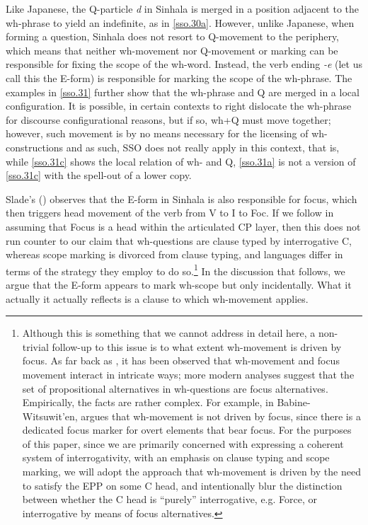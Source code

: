 \documentclass[charis]{glossa}
\begin{document}
Like Japanese, the Q-particle \textit{d\textschwa} in Sinhala is merged in a position adjacent to the wh-phrase to yield an indefinite, as in \ref{sso.30a}. However, unlike Japanese, when forming a question, Sinhala does not resort to Q-movement to the periphery, which means that neither wh-movement nor Q-movement or marking can be responsible for fixing the scope of the wh-word. Instead, the verb ending \textit{-e} (let us call this the E-form) is responsible for marking the scope of the wh-phrase. The examples in \ref{sso.31} further show that the wh-phrase and Q are merged in a local configuration. It is possible, in certain contexts to right dislocate the wh-phrase for discourse configurational reasons, but if so, wh+Q must move together; however, such movement is by no means necessary for the licensing of wh-constructions and as such, SSO does not really apply in this context, that is, while \ref{sso.31c} shows the local relation of wh- and Q, \ref{sso.31a} is not a version of \ref{sso.31c} with the spell-out of a lower copy.

Slade's (\citeyear{slade:2011}) observes that the E-form in Sinhala is also responsible for focus, which then triggers head movement of the verb from V to I to Foc. If we follow \cite{rizzi:97} in assuming that Focus is a head within the articulated CP layer, then this does not run counter to our claim that wh-questions are clause typed by interrogative C, whereas scope marking is divorced from clause typing, and languages differ in terms of the strategy they employ to do so.\footnote{Although this is something that we cannot address in detail here, a non-trivial follow-up to this issue is to what extent wh-movement is driven by focus. As far back as \cite{Huang:1982}, it has been observed that wh-movement and focus movement interact in intricate ways; more modern analyses \citep{beck:2006} suggest that the set of propositional alternatives in wh-questions are focus alternatives. Empirically, the facts are rather complex. For example, in Babine-Witsuwit'en, \cite{denham:00} argues that wh-movement is not driven by focus, since there is a dedicated focus marker for overt elements that bear focus. For the purposes of this paper, since we are primarily concerned with expressing a coherent system of interrogativity, with an emphasis on clause typing and scope marking, we will adopt the approach that wh-movement is driven by the need to satisfy the EPP on some C head, and intentionally blur the distinction between whether the C head is ``purely'' interrogative, e.g. Force, or interrogative by means of focus alternatives.} In the discussion that follows, we argue that the E-form appears to mark wh-scope but only incidentally. What it actually it actually reflects is a clause to which wh-movement applies.
\end{document}
